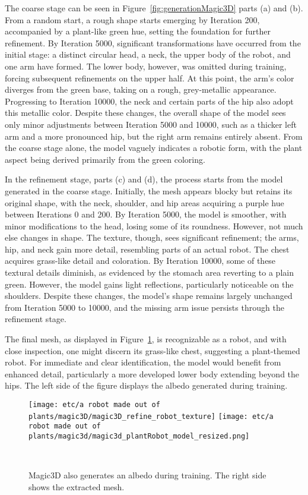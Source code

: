 The coarse stage can be seen in Figure~\ref{fig:generationMagic3D} parts (a) and (b). From a random start, a rough shape starts emerging by Iteration 200, accompanied by a plant-like green hue, setting the foundation for further refinement. By Iteration 5000, significant transformations have occurred from the initial stage: a distinct circular head, a neck, the upper body of the robot, and one arm have formed. The lower body, however, was omitted during training, forcing subsequent refinements on the upper half. At this point, the arm's color diverges from the green base, taking on a rough, grey-metallic appearance. Progressing to Iteration 10000, the neck and certain parts of the hip also adopt this metallic color. Despite these changes, the overall shape of the model sees only minor adjustments between Iteration 5000 and 10000, such as a thicker left arm and a more pronounced hip, but the right arm remains entirely absent. From the coarse stage alone, the model vaguely indicates a robotic form, with the plant aspect being derived primarily from the green coloring.

In the refinement stage, parts (c) and (d), the process starts from the model generated in the coarse stage. Initially, the mesh appears blocky but retains its original shape, with the neck, shoulder, and hip areas acquiring a purple hue between Iterations 0 and 200. By Iteration 5000, the model is smoother, with minor modifications to the head, losing some of its roundness. However, not much else changes in shape. The texture, though, sees significant refinement; the arms, hip, and neck gain more detail, resembling parts of an actual robot. The chest acquires grass-like detail and coloration. By Iteration 10000, some of these textural details diminish, as evidenced by the stomach area reverting to a plain green. However, the model gains light reflections, particularly noticeable on the shoulders. Despite these changes, the model's shape remains largely unchanged from Iteration 5000 to 10000, and the missing arm issue persists through the refinement stage.

The final mesh, as displayed in Figure~\ref{fig:texturesMagic3D}, is recognizable as a robot, and with close inspection, one might discern its grass-like chest, suggesting a plant-themed robot. For immediate and clear identification, the model would benefit from enhanced detail, particularly a more developed lower body extending beyond the hips. The left side of the figure displays the albedo generated during training.

\begin{figure}[H]
    \centering
      \texttt{[image: etc/a robot made out of plants/magic3D/magic3D\_refine\_robot\_texture]}
      \texttt{[image: etc/a robot made out of plants/magic3d/magic3d\_plantRobot\_model\_resized.png]}
      \caption{Magic3D also generates an albedo during training. The right side shows the extracted mesh.}~\label{fig:texturesMagic3D}
\end{figure}
